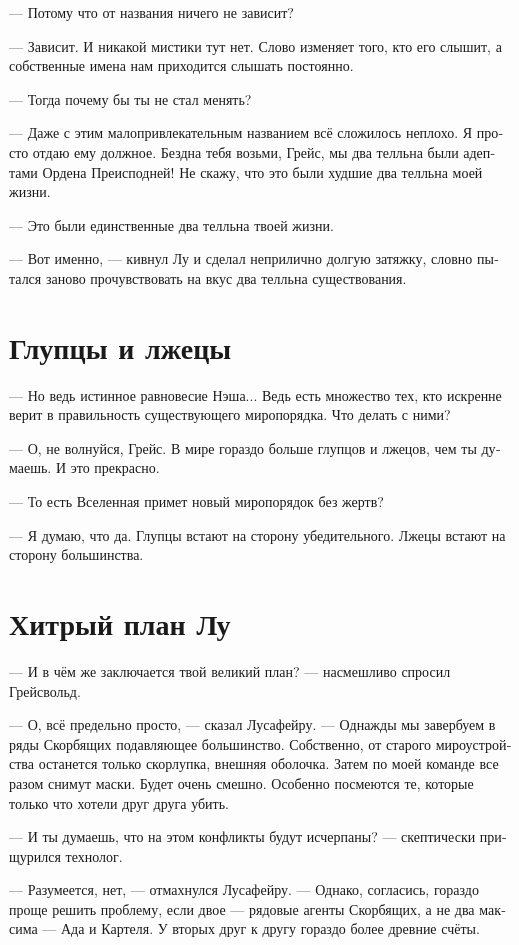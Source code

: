 \documentclass[a4paper,12pt,fleqn]{book}\usepackage{cooltooltips}\usepackage{polyglossia}\setdefaultlanguage[babelshorthands=true]{russian}\setotherlanguage{english}\defaultfontfeatures{Ligatures=TeX,Mapping=tex-text} \usepackage{xcolor}\definecolor{lightgray}{HTML}{bbbbbb}\color{lightgray}\newcommand{\ml}[3]{\textenglish{\textcolor{black}{#3}}}
\begin{document}
{--- Потому что от названия ничего не зависит?

--- Зависит.
И никакой мистики тут нет.
Слово изменяет того, кто его слышит, а собственные имена нам приходится слышать постоянно.

--- Тогда почему бы ты не стал менять?

--- Даже с этим малопривлекательным названием всё сложилось неплохо.
Я просто отдаю ему должное.
Бездна тебя возьми, Грейс, мы два телльна были адептами Ордена Преисподней!
Не скажу, что это были худшие два телльна моей жизни.

--- Это были единственные два телльна твоей жизни.

--- Вот именно, --- кивнул Лу и сделал неприлично долгую затяжку, словно пытался заново прочувствовать на вкус два телльна существования.

\section{Глупцы и лжецы}

--- Но ведь истинное равновесие Нэша...
Ведь есть множество тех, кто искренне верит в правильность существующего миропорядка.
Что делать с ними?

--- О, не волнуйся, Грейс.
В мире гораздо больше глупцов и лжецов, чем ты думаешь.
И это прекрасно.

--- То есть Вселенная примет новый миропорядок без жертв?

--- Я думаю, что да.
Глупцы встают на сторону убедительного.
Лжецы встают на сторону большинства.

\section{Хитрый план Лу}

--- И в чём же заключается твой великий план? --- насмешливо спросил Грейсвольд.

--- О, всё предельно просто, --- сказал Лусафейру.
--- Однажды мы завербуем в ряды Скорбящих подавляющее большинство.
Собственно, от старого мироустройства останется только скорлупка, внешняя оболочка.
Затем по моей команде все разом снимут маски.
Будет очень смешно.
Особенно посмеются те, которые только что хотели друг друга убить.

--- И ты думаешь, что на этом конфликты будут исчерпаны? --- скептически прищурился технолог.

--- Разумеется, нет, --- отмахнулся Лусафейру.
--- Однако, согласись, гораздо проще решить проблему, если двое --- рядовые агенты Скорбящих, а не два максима --- Ада и Картеля.
У вторых друг к другу гораздо более древние счёты.

}
\end{document}
